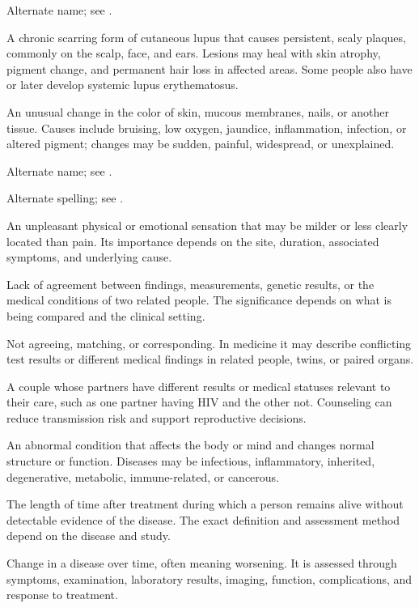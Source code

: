  Alternate name; see .

 A chronic scarring form of cutaneous lupus that causes persistent,
scaly plaques, commonly on the scalp, face, and ears. Lesions may heal with skin atrophy,
pigment change, and permanent hair loss in affected areas. Some people also have or later
develop systemic lupus erythematosus.

 An unusual change in the color of skin, mucous membranes, nails, or another tissue. Causes include bruising, low oxygen, jaundice, inflammation, infection, or altered pigment; changes may be sudden, painful, widespread, or unexplained.

 Alternate name; see .

 Alternate spelling; see .

 An unpleasant physical or emotional sensation that may be milder or less clearly located than pain. Its importance depends on the site, duration, associated symptoms, and underlying cause.

 Lack of agreement between findings, measurements, genetic results, or the medical conditions of two related people. The significance depends on what is being compared and the clinical setting.

 Not agreeing, matching, or corresponding. In medicine it may describe conflicting test results or different medical findings in related people, twins, or paired organs.

 A couple whose partners have different results or medical statuses relevant to their care, such as one partner having HIV and the other not. Counseling can reduce transmission risk and support reproductive decisions.

 An abnormal condition that affects the body or mind and changes normal structure or function. Diseases may be infectious, inflammatory, inherited, degenerative, metabolic, immune-related, or cancerous.

 The length of time after treatment during which a person remains alive without detectable evidence of the disease. The exact definition and assessment method depend on the disease and study.

 Change in a disease over time, often meaning worsening. It is assessed through symptoms, examination, laboratory results, imaging, function, complications, and response to treatment.

